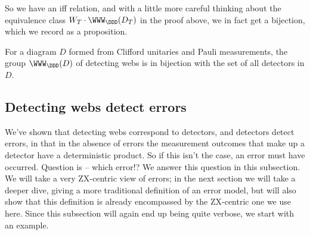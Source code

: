 So we have an iff relation, and with a little more careful thinking about the equivalence class $W_T \cdot \WWW_\DDD(D_T)$ in the proof above, we in fact get a bijection, which we record as a proposition.

\begin{proposition}\label{prop:detecting_webs_bijection}
    For a diagram $D$ formed from Clifford unitaries and Pauli measurements, the group $\WWW_\DDD(D)$ of detecting webs is in bijection with the set of all detectors in $D$.
\end{proposition}

\subsection{Detecting webs detect errors}\label{subsec:detecting_webs_detect_errors}

We've shown that detecting webs correspond to detectors, and detectors detect errors, in that in the absence of errors the measurement outcomes that make up a detector have a deterministic product.
So if this isn't the case, an error must have occurred.
Question is -- which error!?
We answer this question in this subsection.
We will take a very ZX-centric view of errors; in the next section we will take a deeper dive, giving a more traditional definition of an error model, but will also show that this definition is already encompassed by the ZX-centric one we use here.
Since this subsection will again end up being quite verbose, we start with an example.

